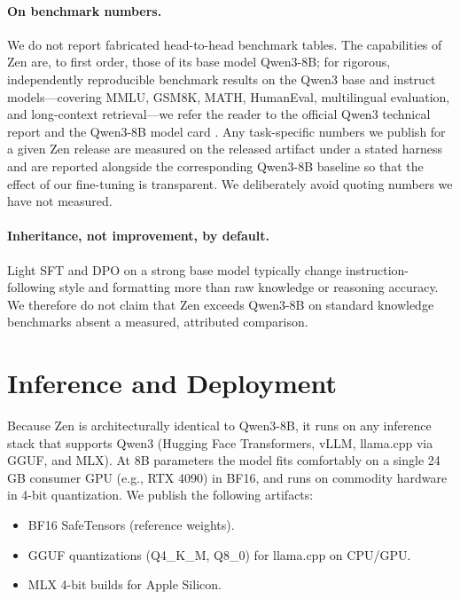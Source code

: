 \documentclass[11pt,a4paper]{article}
\begin{document}
\paragraph{On benchmark numbers.} We do not report fabricated head-to-head benchmark tables. The
capabilities of Zen are, to first order, those of its base model Qwen3-8B; for rigorous,
independently reproducible benchmark results on the Qwen3 base and instruct models---covering MMLU,
GSM8K, MATH, HumanEval, multilingual evaluation, and long-context retrieval---we refer the reader to
the official Qwen3 technical report \cite{qwen3report} and the Qwen3-8B model card \cite{qwen3hf}.
Any task-specific numbers we publish for a given Zen release are measured on the released artifact
under a stated harness and are reported alongside the corresponding Qwen3-8B baseline so that the
effect of our fine-tuning is transparent. We deliberately avoid quoting numbers we have not
measured.

\paragraph{Inheritance, not improvement, by default.} Light SFT and DPO on a strong base model
typically change instruction-following style and formatting more than raw knowledge or reasoning
accuracy. We therefore do not claim that Zen exceeds Qwen3-8B on standard knowledge benchmarks
absent a measured, attributed comparison.

\section{Inference and Deployment}

Because Zen is architecturally identical to Qwen3-8B, it runs on any inference stack that supports
Qwen3 (Hugging Face Transformers, vLLM, llama.cpp via GGUF, and MLX). At 8B parameters the model
fits comfortably on a single 24\,GB consumer GPU (e.g., RTX 4090) in BF16, and runs on commodity
hardware in 4-bit quantization. We publish the following artifacts:

\begin{itemize}
  \item BF16 SafeTensors (reference weights).
  \item GGUF quantizations (Q4\_K\_M, Q8\_0) for llama.cpp on CPU/GPU.
  \item MLX 4-bit builds for Apple Silicon.
\end{itemize}
\end{document}
